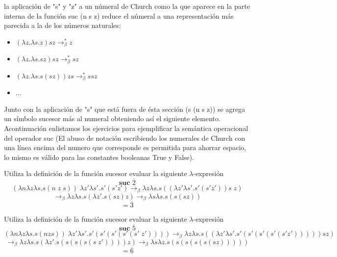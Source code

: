         la aplicación de "s" y "z" a un númeral de Church como la que aparece en la parte interna de la función suc (n s z) reduce el númeral a una representación más parecida a la de los números naturales:    
        \begin{itemize}
            \item $(\lambda z.\lambda s.z)sz \rightarrow_\beta^* z$
            \item $(\lambda z.\lambda s.sz)sz  \rightarrow_\beta^* sz$
            \item $(\lambda z.\lambda s.s(sz))zs \rightarrow_\beta^* ssz$
            \item ...
        \end{itemize}

        Junto con la aplicación de "s" que está fuera de ésta sección (s (n s z)) se agrega un símbolo sucesor más al numeral obteniendo así el siguiente elemento.\\

        Acontinuación enlistamos los ejercicios para ejemplificar la semántica operacional del operador suc (El abuso de notación escribiendo los numerales de Church con una línea encima del numero que corresponde es permitida para ahorrar espacio, lo mismo es válido para las constantes booleanas True y False).

        \bigskip

        \begin{exercise}
            Utiliza la definición de la función sucesor evaluar la siguiente  $\lambda$-expresión
            \[
                \textbf{suc } \overline{2}
            \]
            \[
                (\lambda n\lambda z\lambda s.s(n \; z \; s) ) \; \lambda z'\lambda s'.s'(s'z') \rightarrow_\beta \lambda z\lambda s.s((\lambda z'\lambda s'.s'(s'z')) s \; z)
            \]
            \[
                \rightarrow_\beta \lambda z\lambda s.s(\lambda z'.s(sz) z) \rightarrow_\beta \lambda s\lambda s.s(s(sz))
            \]
            \[
                = \overline{3}
            \]
        \end{exercise}

        \begin{exercise}
            Utiliza la definición de la función sucesor evaluar la siguiente  $\lambda$-expresión
            \[
                \textbf{suc } \overline{5}
            \]
            \[
                (\lambda n\lambda z\lambda s.s(n z s) ) \; \lambda z'\lambda s'.s'(s'(s'(s'(s' \; z')))) \rightarrow_\beta \lambda z\lambda s.s((\lambda z'\lambda s'.s'(s'(s'(s'(s'z'))))) s z)
            \]
            \[
                \rightarrow_\beta \lambda z\lambda s.s(\lambda z'.s(s(s(s(s\;z')))) z) \rightarrow_\beta \lambda s\lambda z.s(s(s(s(s(sz)))))
            \]
            \[
                = \overline{6}
            \]
        \end{exercise}

